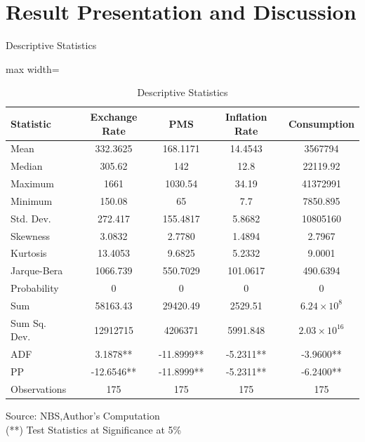 \documentclass{beamer}
\begin{document}
{\section{Result Presentation and Discussion}
\begin{frame}{Descriptive Statistics}
    \centering
    \scriptsize %
    \begin{table}[h!]
        \centering
        \caption{Descriptive Statistics}
        \begin{adjustbox}{max width=\textwidth}
            \begin{tabular}{lcccc}
                \toprule
                \textbf{Statistic} & \textbf{Exchange Rate} & \textbf{PMS} & \textbf{Inflation Rate} & \textbf{Consumption} \\
                \midrule
                Mean & 332.3625 & 168.1171 & 14.4543 & 3567794 \\
                Median & 305.62 & 142 & 12.8 & 22119.92 \\
                Maximum & 1661 & 1030.54 & 34.19 & 41372991 \\
                Minimum & 150.08 & 65 & 7.7 & 7850.895 \\
                Std. Dev. & 272.417 & 155.4817 & 5.8682 & 10805160 \\
                Skewness & 3.0832 & 2.7780 & 1.4894 & 2.7967 \\
                Kurtosis & 13.4053 & 9.6825 & 5.2332 & 9.0001 \\
                Jarque-Bera & 1066.739 & 550.7029 & 101.0617 & 490.6394 \\
                Probability & 0 & 0 & 0 & 0 \\
                Sum & 58163.43 & 29420.49 & 2529.51 & $6.24 \times 10^8$ \\
                Sum Sq. Dev. & 12912715 & 4206371 & 5991.848 & $2.03 \times 10^{16}$ \\
                ADF & 3.1878** & -11.8999** & -5.2311** & -3.9600** \\
                PP & -12.6546** & -11.8999** & -5.2311** & -6.2400** \\
                Observations & 175 & 175 & 175 & 175 \\
                \bottomrule
            \end{tabular}
        \end{adjustbox}
    \end{table}
   Source: NBS,Author's Computation\\
    (**) Test Statistics at Significance at 5\%
\end{frame}

}
\end{document}
